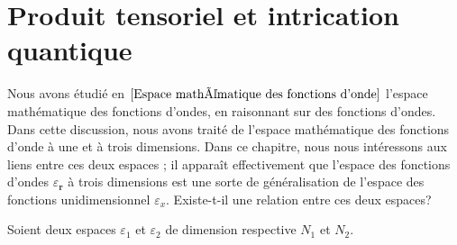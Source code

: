 \documentclass[../notesdecours.tex]{subfiles}
\begin{document}
\chapter{Produit tensoriel et intrication quantique}

Nous avons étudié en $\ref{Espace mathématique des fonctions d'onde}$ l'espace mathématique des fonctions d'ondes, en raisonnant sur des fonctions d'ondes. Dans cette discussion, nous avons traité de l'espace mathématique des fonctions d'onde à une et à trois dimensions. Dans ce chapitre, nous nous intéressons aux liens entre ces deux espaces ; il apparaît effectivement que l'espace des fonctions d'ondes $\mathcal{\varepsilon}_{\bm{r}}$ à trois dimensions est une sorte de généralisation de l'espace des fonctions unidimensionnel $\mathcal{\varepsilon}_x$. Existe-t-il une relation entre ces deux espaces?\\

\begin{remark} Soient deux espaces $\varepsilon_1$ et $\varepsilon_2$ de dimension respective $N_1$ et $N_2$. \end{remark}
\end{document}
